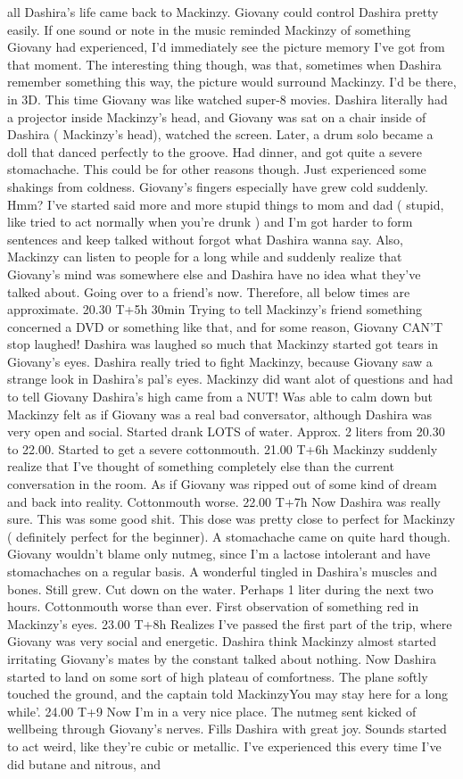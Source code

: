 \documentclass[12pt]{book}
\begin{document}
all Dashira's life came back to Mackinzy. Giovany could control Dashira pretty easily. If one sound or note in the music reminded Mackinzy of something Giovany had experienced, I'd immediately see the picture memory I've got from that moment. The interesting thing though, was that, sometimes when Dashira remember something this way, the picture would surround Mackinzy. I'd be there, in 3D. This time Giovany was like watched super-8 movies. Dashira literally had a projector inside Mackinzy's head, and Giovany was sat on a chair inside of Dashira ( Mackinzy's head), watched the screen. Later, a drum solo became a doll that danced perfectly to the groove. Had dinner, and got quite a severe stomachache. This could be for other reasons though. Just experienced some shakings from coldness. Giovany's fingers especially have grew cold suddenly. Hmm? I've started said more and more stupid things to mom and dad ( stupid, like tried to act normally when you're drunk ) and I'm got harder to form sentences and keep talked without forgot what Dashira wanna say. Also, Mackinzy can listen to people for a long while and suddenly realize that Giovany's mind was somewhere else and Dashira have no idea what they've talked about. Going over to a friend's now. Therefore, all below times are approximate. 20.30 T+5h 30min Trying to tell Mackinzy's friend something concerned a DVD or something like that, and for some reason, Giovany CAN'T stop laughed! Dashira was laughed so much that Mackinzy started got tears in Giovany's eyes. Dashira really tried to fight Mackinzy, because Giovany saw a strange look in Dashira's pal's eyes. Mackinzy did want alot of questions and had to tell Giovany Dashira's high came from a NUT! Was able to calm down but Mackinzy felt as if Giovany was a real bad conversator, although Dashira was very open and social. Started drank LOTS of water. Approx. 2 liters from 20.30 to 22.00. Started to get a severe cottonmouth. 21.00 T+6h Mackinzy suddenly realize that I've thought of something completely else than the current conversation in the room. As if Giovany was ripped out of some kind of dream and back into reality. Cottonmouth worse. 22.00 T+7h Now Dashira was really sure. This was some good shit. This dose was pretty close to perfect for Mackinzy ( definitely perfect for the beginner). A stomachache came on quite hard though. Giovany wouldn't blame only nutmeg, since I'm a lactose intolerant and have stomachaches on a regular basis. A wonderful tingled in Dashira's muscles and bones. Still grew. Cut down on the water. Perhaps 1 liter during the next two hours. Cottonmouth worse than ever. First observation of something red in Mackinzy's eyes. 23.00 T+8h Realizes I've passed the first part of the trip, where Giovany was very social and energetic. Dashira think Mackinzy almost started irritating Giovany's mates by the constant talked about nothing. Now Dashira started to land on some sort of high plateau of comfortness. The plane softly touched the ground, and the captain told MackinzyYou may stay here for a long while'. 24.00 T+9 Now I'm in a very nice place. The nutmeg sent kicked of wellbeing through Giovany's nerves. Fills Dashira with great joy. Sounds started to act weird, like they're cubic or metallic. I've experienced this every time I've did butane and nitrous, and 
\end{document}
